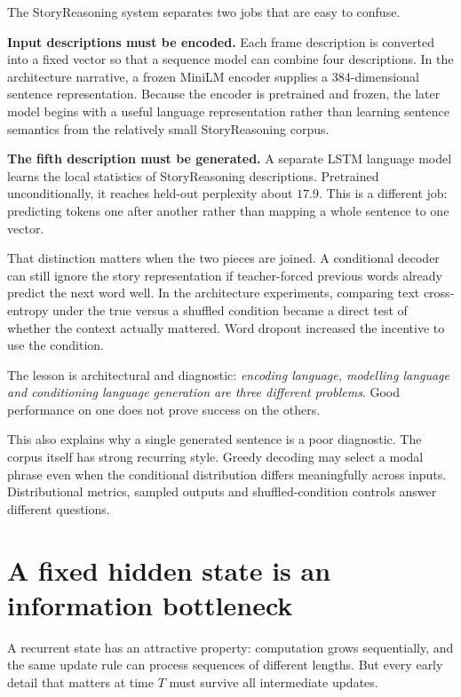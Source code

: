 \begin{architecturebox}
The StoryReasoning system separates two jobs that are easy to confuse.

\textbf{Input descriptions must be encoded.} Each frame description is converted into a fixed vector so that a sequence model can combine four descriptions. In the architecture narrative, a frozen MiniLM encoder supplies a 384-dimensional sentence representation. Because the encoder is pretrained and frozen, the later model begins with a useful language representation rather than learning sentence semantics from the relatively small StoryReasoning corpus.

\textbf{The fifth description must be generated.} A separate LSTM language model learns the local statistics of StoryReasoning descriptions. Pretrained unconditionally, it reaches held-out perplexity about \(17.9\). This is a different job: predicting tokens one after another rather than mapping a whole sentence to one vector.

That distinction matters when the two pieces are joined. A conditional decoder can still ignore the story representation if teacher-forced previous words already predict the next word well. In the architecture experiments, comparing text cross-entropy under the true versus a shuffled condition became a direct test of whether the context actually mattered. Word dropout increased the incentive to use the condition.

The lesson is architectural and diagnostic: \emph{encoding language, modelling language and conditioning language generation are three different problems}. Good performance on one does not prove success on the others.
\end{architecturebox}

This also explains why a single generated sentence is a poor diagnostic. The corpus itself has strong recurring style. Greedy decoding may select a modal phrase even when the conditional distribution differs meaningfully across inputs. Distributional metrics, sampled outputs and shuffled-condition controls answer different questions.

\section{A fixed hidden state is an information bottleneck}

A recurrent state has an attractive property: computation grows sequentially, and the same update rule can process sequences of different lengths. But every early detail that matters at time \(T\) must survive all intermediate updates.

